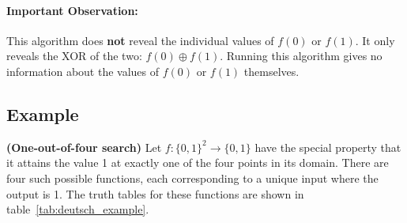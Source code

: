 \paragraph{Important Observation:} This algorithm does \textbf{not} reveal the individual values of $f(0)$ or $f(1)$. It only reveals the XOR of the two: $f(0) \oplus f(1)$. Running this algorithm gives no information about the values of $f(0)$ or $f(1)$ themselves.


\subsection{Example}
\begin{example}
    \textbf{(One-out-of-four search)} Let $f:\{0,1\}^2 \rightarrow \{0,1\}$ have the special property that it attains the value 1 at exactly one of the four points in its domain. There are four such possible functions, each corresponding to a unique input where the output is 1. The truth tables for these functions are shown in table~\ref{tab:deutsch_example}.


\end{example}
